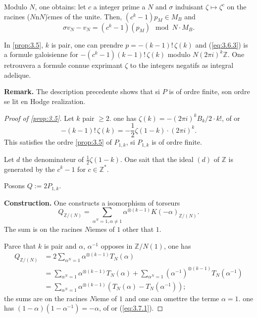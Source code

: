 \documentclass[12pt,a4paper]{article}
\theoremstyle{plain}
\theoremstyle{definition}
\theoremstyle{remark}
\begin{document}
\begin{paraphrase}[3.6]
Modulo $N$, one obtains: let $c$ a integer prime a $N$ and $\sigma$ induisant
$\zeta \mapsto \zeta^c$ on the racines ($N$n$N$)$\grave{e}$mes of the unite. Then,
$(c^k-1)p_M \in M_B$ and
\begin{equation}\label{eq:3.6.3}
\sigma v_N - v_N = (c^k-1)(p_M) \mod N \cdot M_B.
\end{equation}

In \ref{prop:3.5}, $k$ is pair, one can prendre $p = -(k-1)!\,\zeta(k)$ and
(\ref{eq:3.6.3}) is a formule galoisienne for $-(c^k-1)(k-1)!\,\zeta(k)$ modulo
$N(2\pi i)^k \mathbb{Z}$. One retrouvera a formule connue exprimant $\zeta$ to the integers
negatifs as integral adelique.

\textbf{Remark.} The description precedente shows that si $P$ is of ordre finite, son
ordre se lit en Hodge realization.
\end{paraphrase}

\begin{proof}[Proof of \ref{prop:3.5}]
Let $k$ pair $\geq 2$. one has $\zeta(k) = -(2\pi i)^k B_k / 2 \cdot k!$, of or
\[
-(k-1)!\,\zeta(k) = -\frac{1}{2}\zeta(1-k) \cdot (2\pi i)^k.
\]
This satisfies the ordre \ref{prop:3.5} of $P_{1,k}$, si $P_{1,k}$ is of ordre finite.

Let $d$ the denominateur of $\frac{1}{2}\zeta(1-k)$. One sait that the ideal $(d)$ of
$\mathbb{Z}$ is generated by the $c^k-1$ for $c \in \mathbb{Z}^*$.

Posons $Q := 2P_{1,k}$.

\textbf{Construction.} One constructs a isomorphism of torseurs
\begin{equation}\label{eq:3.7.1}
Q_{\mathbb{Z}/(N)} = \sum_{\alpha^N=1, \alpha \neq 1} \alpha^{\otimes(k-1)}
K(-\alpha)_{\mathbb{Z}/(N)}.
\end{equation}
The sum is on the racines $N$iemes of $1$ other that $1$.

Parce that $k$ is pair and $\alpha$, $\alpha^{-1}$ opposes in $\mathbb{Z}/N(1)$, one has
\begin{align*}
Q_{\mathbb{Z}/(N)} &= 2 \sum_{\alpha^N=1} \alpha^{\otimes(k-1)} T_N(\alpha) \\
&= \sum_{\alpha^N=1} \alpha^{\otimes(k-1)} T_N(\alpha) +
\sum_{\alpha^N=1} (\alpha^{-1})^{\otimes(k-1)} T_N(\alpha^{-1}) \\
&= \sum_{\alpha^N=1} \alpha^{\otimes(k-1)} (T_N(\alpha) - T_N(\alpha^{-1}));
\end{align*}
the sums are on the racines $N$ieme of $1$ and one can omettre the terme
$\alpha = 1$. one has $(1-\alpha)(1-\alpha^{-1}) = -\alpha$, of or
(\ref{eq:3.7.1}).
\end{proof}
\end{document}
